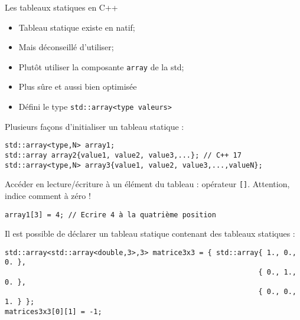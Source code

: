 \documentclass[compress,10pt,aspectratio=169]{beamer}
\begin{document}
\begin{frame}[fragile]{Les tableaux statiques en C++}
    \scriptsize
    \begin{multicols}{2}
    \begin{itemize}
    \item Tableau statique existe en natif;
    \item Mais déconseillé d'utiliser;
    \item Plutôt utiliser la composante \texttt{array} de la std;
    \item Plus sûre et aussi bien optimisée
    \item Défini le type \texttt{std::array<type valeurs>}
    \end{itemize}
\end{multicols}

Plusieurs façons d'initialiser un tableau statique :
\begin{verbatim}
std::array<type,N> array1;
std::array array2{value1, value2, value3,...}; // C++ 17
std::array<type,N> array3{value1, value2, value3,...,valueN};
\end{verbatim}

Accéder en lecture/écriture à un élément du tableau : opérateur \texttt{[]}. Attention, indice comment à zéro !
\begin{verbatim}
array1[3] = 4; // Ecrire 4 à la quatrième position
\end{verbatim}

Il est possible de déclarer un tableau statique contenant des tableaux statiques :
\begin{verbatim}
std::array<std::array<double,3>,3> matrice3x3 = { std::array{ 1., 0., 0. },
                                                            { 0., 1., 0. },
                                                            { 0., 0., 1. } };
matrices3x3[0][1] = -1;
\end{verbatim}
\end{frame}
\end{document}
